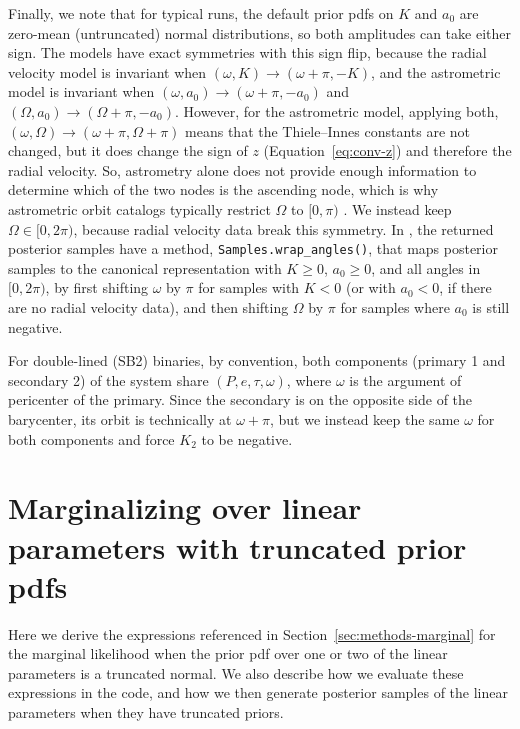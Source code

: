 \documentclass[twocolumn]{AASTeX7/aastex701}
\newcommand{\harv}{\package{harv}}
\begin{document}
Finally, we note that for typical runs, the default prior pdfs on $K$ and $a_0$ are
zero-mean (untruncated) normal distributions, so both amplitudes can take either sign.
The models have exact symmetries with this sign flip, because the radial velocity model
is invariant when $(\omega, K) \to (\omega + \pi, -K)$, and the astrometric model is
invariant when $(\omega, a_0) \to (\omega + \pi, -a_0)$ and $(\Omega, a_0) \to (\Omega +
\pi, -a_0)$.
However, for the astrometric model, applying both, $(\omega, \Omega) \to (\omega + \pi,
\Omega + \pi)$ means that the Thiele--Innes constants are not changed, but it does
change the sign of $z$ (Equation~\ref{eq:conv-z}) and therefore the radial velocity.
So, astrometry alone does not provide enough information to determine which of the two
nodes is the ascending node, which is why astrometric orbit catalogs typically restrict
$\Omega$ to $[0, \pi)$ \citep[e.g.,][]{Halbwachs:2023}.
We instead keep $\Omega \in [0, 2\pi)$, because radial velocity data break this
symmetry.
In \harv, the returned posterior samples have a method, \texttt{Samples.wrap\_angles()},
that maps posterior samples to the canonical representation with $K \geq 0$, $a_0 \geq
0$, and all angles in $[0, 2\pi)$, by first shifting $\omega$ by $\pi$ for samples with
$K < 0$ (or with $a_0 < 0$, if there are no radial velocity data), and then shifting
$\Omega$ by $\pi$ for samples where $a_0$ is still negative.

For double-lined (SB2) binaries, by convention, both components (primary 1 and secondary
2) of the system  share $(P, e, \tau, \omega)$, where $\omega$ is the argument of
pericenter of the primary.
Since the secondary is on the opposite side of the barycenter, its orbit is technically
at $\omega + \pi$, but we instead keep the same $\omega$ for both components and force
$K_2$ to be negative.


\section{Marginalizing over linear parameters with truncated prior pdfs}
\label{apx:truncated}

Here we derive the expressions referenced in Section~\ref{sec:methods-marginal} for the
marginal likelihood when the prior pdf over one or two of the linear parameters is a
truncated normal.
We also describe how we evaluate these expressions in the code, and how we then generate
posterior samples of the linear parameters when they have truncated priors.
\end{document}
